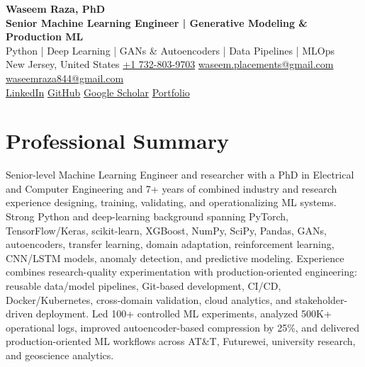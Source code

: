 \documentclass[10pt,letterpaper]{extarticle}
\begin{document}
\begin{center}
{\LARGE\bfseries Waseem Raza, PhD}\\[2pt]
{\large\bfseries Senior Machine Learning Engineer | Generative Modeling \& Production ML}\\[1pt]
{\small Python | Deep Learning | GANs \& Autoencoders | Data Pipelines | MLOps}\\[3pt]
{\footnotesize New Jersey, United States \quad
{}\enspace \href{tel:+17328039703}{+1 732-803-9703} \quad
{}\enspace \href{mailto:waseem.placements@gmail.com}{waseem.placements@gmail.com} \textbar{}
\href{mailto:waseemraza844@gmail.com}{waseemraza844@gmail.com}\\[1pt]
\href{https://www.linkedin.com/in/waseem-raza-phd-9a737858/}{LinkedIn} \textbar{}
\href{https://github.com/WaseemRaza844}{GitHub} \textbar{}
\href{https://scholar.google.com/citations?user=d58Drr0AAAAJ&hl=en}{Google Scholar} \textbar{}
\href{https://waseemraza844.github.io/portfolio/}{Portfolio}}
\end{center}
\vspace{-5pt}

\section{Professional Summary}
Senior-level Machine Learning Engineer and researcher with a PhD in Electrical and Computer Engineering and 7+ years of combined industry and research experience designing, training, validating, and operationalizing ML systems. Strong Python and deep-learning background spanning PyTorch, TensorFlow/Keras, scikit-learn, XGBoost, NumPy, SciPy, Pandas, GANs, autoencoders, transfer learning, domain adaptation, reinforcement learning, CNN/LSTM models, anomaly detection, and predictive modeling. Experience combines research-quality experimentation with production-oriented engineering: reusable data/model pipelines, Git-based development, CI/CD, Docker/Kubernetes, cross-domain validation, cloud analytics, and stakeholder-driven deployment. Led 100+ controlled ML experiments, analyzed 500K+ operational logs, improved autoencoder-based compression by 25\%, and delivered production-oriented ML workflows across AT\&T, Futurewei, university research, and geoscience analytics.
\end{document}

